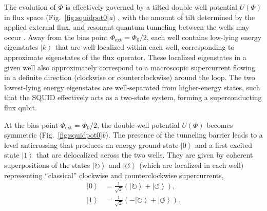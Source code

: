 \documentclass[3p,sort&compress]{elsarticle}
\newcommand{\ket}[1]{\left\vert{#1}\right\rangle}
\begin{document}
The evolution of $\Phi$ is effectively governed by a tilted double-well potential $U(\Phi)$ in flux space (Fig.~\ref{fig:squidpot0}\emph{a}) \cite{Weiss:1999:tv}, with the amount of tilt determined by the applied external flux, and resonant quantum tunneling between the wells may occur \cite{Silvestrini:1996:ii,Rouse:1998:om}. Away from the bias point $\Phi_\text{ext}=\Phi_0/2$, each well contains low-lying energy eigenstates $\ket{k}$ that are well-localized within each well, corresponding to approximate eigenstates of the flux operator. These localized eigenstates in a given well also approximately correspond to a macroscopic supercurrent flowing in a definite direction (clockwise or counterclockwise) around the loop. The two lowest-lying energy eigenstates are well-separated from higher-energy states, such that the SQUID effectively acts as a two-state system, forming a superconducting flux qubit.

At the bias point $\Phi_\text{ext}=\Phi_0/2$, the double-well potential $U(\Phi)$ becomes symmetric (Fig.~\ref{fig:squidpot0}\emph{b}). The presence of the tunneling barrier leads to a level anticrossing that produces an energy ground state $\ket{0}$ and a first excited state $\ket{1}$ that are delocalized across the two wells. They are given by coherent superpositions of the states $\ket{\circlearrowright}$ and $\ket{\circlearrowleft}$ (which are localized in each well) representing ``classical'' clockwise and counterclockwise supercurrents, 
%
\begin{subequations}
\begin{align} 
\ket{0} &= \frac{1}{\sqrt{2}} \left(  \ket{\circlearrowright} + 
\ket{\circlearrowleft} \right), \label{eq:scqqqq3}\\
\ket{1} &= \frac{1}{\sqrt{2}} \left( - \ket{\circlearrowright} + 
\ket{\circlearrowleft} \right). \label{eq:scqqqq4}
\end{align}
\end{subequations}
%
\end{document}
